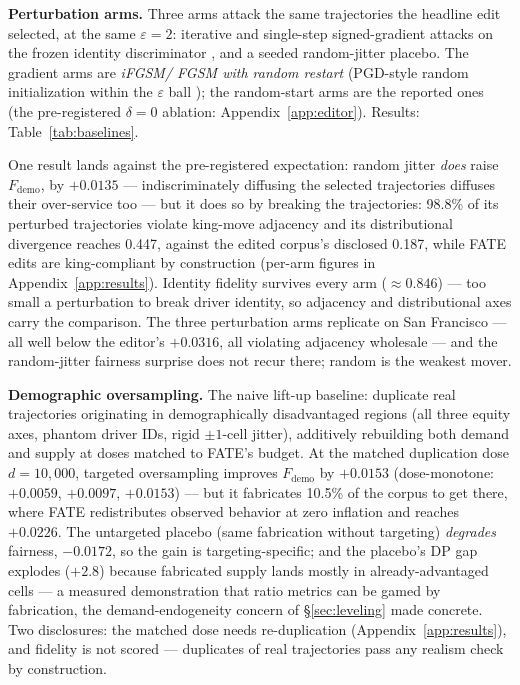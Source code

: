 \textbf{Perturbation arms.} Three arms attack the same trajectories the
headline edit selected, at the same $\varepsilon = 2$: iterative and
single-step signed-gradient attacks on the frozen identity discriminator
\cite{hu2023stifgsm}, and
a seeded random-jitter placebo. The gradient arms are \emph{iFGSM\slash
FGSM with random restart} \cite{kurakin2017ifgsm,goodfellow2015fgsm}
(PGD-style random initialization within the
$\varepsilon$ ball \cite{madry2018pgd}); the random-start arms are the
reported ones (the pre-registered $\delta = 0$ ablation:
Appendix~\ref{app:editor}). Results: Table~\ref{tab:baselines}.

One result lands against the pre-registered expectation: random jitter
\emph{does} raise $F_{\mathrm{demo}}$, by $+0.0135$ --- indiscriminately
diffusing the selected trajectories diffuses their over-service too --- but it
does so by breaking the trajectories: 98.8\% of its perturbed trajectories
violate king-move adjacency and its distributional divergence reaches 0.447,
against the edited corpus's disclosed 0.187, while FATE edits are
king-compliant by construction (per-arm figures in
Appendix~\ref{app:results}). Identity fidelity survives every arm
($\approx 0.846$) --- too small a perturbation to break driver identity, so
adjacency and distributional axes carry the comparison. The three perturbation arms replicate on San
Francisco --- all well below the editor's $+0.0316$, all violating adjacency
wholesale --- and the random-jitter fairness surprise does not recur there;
random is the weakest mover.

\textbf{Demographic oversampling.} The naive lift-up baseline: duplicate
real trajectories originating in demographically disadvantaged regions
\cite{kamirancalders2012,zietlow2022} (all
three equity axes, phantom driver IDs, rigid $\pm 1$-cell jitter), additively
rebuilding both demand and supply at doses matched to FATE's budget. At
the matched duplication dose $d = 10{,}000$, targeted oversampling improves
$F_{\mathrm{demo}}$ by $+0.0153$ (dose-monotone:
$+0.0059$, $+0.0097$, $+0.0153$) --- but it fabricates 10.5\% of the corpus
to get there, where FATE redistributes observed behavior at zero inflation
and reaches $+0.0226$. The untargeted placebo (same fabrication without targeting)
\emph{degrades} fairness, $-0.0172$, so the gain is targeting-specific; and
the placebo's DP gap explodes ($+2.8$) because fabricated supply lands
mostly in already-advantaged cells --- a measured demonstration that
ratio metrics can be gamed by fabrication, the demand-endo\-ge\-ne\-ity concern of
\S\ref{sec:leveling} made concrete. Two disclosures: the matched dose needs
re-duplication (Appendix~\ref{app:results}), and fidelity is not
scored --- duplicates of real trajectories pass any realism check by
construction.

